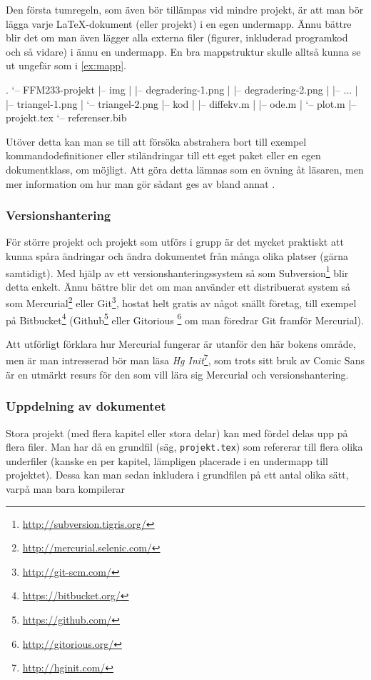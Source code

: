\documentclass[lang=sv,ptsize=10pt,font=none,nomath,titles=bf,../../a4.tex]{subfiles}
\begin{document}
Den första tumregeln, som även bör tillämpas vid mindre projekt, är att
man bör lägga varje \LaTeX-dokument (eller projekt) i en egen undermapp.
Ännu bättre blir det om man även lägger alla externa filer (figurer,
inkluderad programkod och så vidare) i ännu en undermapp. En bra
mappstruktur skulle alltså kunna se ut ungefär som i \cref{ex:mapp}.

\begin{kod}
	\begin{textcode}
.
`-- FFM233-projekt
|-- img
|   |-- degradering-1.png
|   |-- degradering-2.png
|   |-- ...
|   |-- triangel-1.png
|   `-- triangel-2.png
|-- kod
|   |-- diffekv.m
|   |-- ode.m
|   `-- plot.m
|-- projekt.tex
`-- referenser.bib
	\end{textcode}
	\caption{En bra mappstruktur för ett enkelt \LaTeX-projekt.}
	\label{ex:mapp}
\end{kod}

Utöver detta kan man se till att försöka abstrahera bort till exempel
kommandodefinitioner eller stiländringar till ett eget paket eller en
egen dokumentklass, om möjligt. Att göra detta lämnas som en övning åt
läsaren, men mer information om hur man gör sådant ges av bland annat
\textcites{Flynn06}{LaTeX3}{Robertson06}.

\subsubsection{Versionshantering}
För större projekt och projekt som utförs i grupp är det mycket praktiskt
att kunna spåra ändringar och ändra dokumentet från många olika platser
(gärna samtidigt). Med hjälp av ett versionshanteringssystem så som 
Subversion\footnote{\url{http://subversion.tigris.org/}} blir detta
enkelt. Ännu bättre blir det om man använder ett distribuerat system så
som Mercurial\footnote{\url{http://mercurial.selenic.com/}} eller
Git\footnote{\url{http://git-scm.com/}}, hostat helt gratis av något snällt
företag, till exempel på Bitbucket\footnote{\url{https://bitbucket.org/}}
(Github\footnote{\url{https://github.com/}} eller Gitorious%
\footnote{\url{http://gitorious.org/}} om man föredrar Git framför Mercurial).

Att utförligt förklara hur Mercurial fungerar är utanför den här bokens
område, men är man intresserad bör man läsa
\emph{Hg Init}\footnote{\url{http://hginit.com/}}, som trots sitt bruk av
Comic Sans är en utmärkt resurs för den som vill lära sig Mercurial och
versionshantering.

\subsubsection{Uppdelning av dokumentet}
Stora projekt (med flera kapitel eller stora delar) kan med fördel delas
upp på flera filer. Man har då en grundfil (säg, \texttt{projekt.tex}) som
refererar till flera olika underfiler (kanske en per kapitel, lämpligen
placerade i en undermapp till projektet). Dessa kan man sedan inkludera
i grundfilen på ett antal olika sätt, varpå man bara kompilerar
\end{document}
